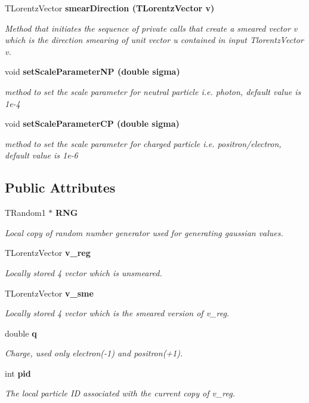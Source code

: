 \begin{CompactItemize}
TLorentz\-Vector \bf{smear\-Direction} (TLorentz\-Vector v)
\begin{CompactList}\small\item\em Method that initiates the sequence of private calls that create a smeared vector v which is the direction smearing of unit vector u contained in input Tlorentz\-Vector v. \item\end{CompactList}\item 
void \bf{set\-Scale\-Parameter\-NP} (double sigma)
\begin{CompactList}\small\item\em method to set the scale parameter for neutral particle i.e. photon, default value is 1e-4 \item\end{CompactList}\item 
void \bf{set\-Scale\-Parameter\-CP} (double sigma)
\begin{CompactList}\small\item\em method to set the scale parameter for charged particle i.e. positron/electron, default value is 1e-6 \item\end{CompactList}\end{CompactItemize}
\subsection*{Public Attributes}
\begin{CompactItemize}
\item 
TRandom1 $\ast$ \bf{RNG}
\begin{CompactList}\small\item\em Local copy of random number generator used for generating gaussian values. \item\end{CompactList}\item 
TLorentz\-Vector \bf{v\_\-reg}
\begin{CompactList}\small\item\em Locally stored 4 vector which is unsmeared. \item\end{CompactList}\item 
TLorentz\-Vector \bf{v\_\-sme}
\begin{CompactList}\small\item\em Locally stored 4 vector which is the smeared version of v\_\-reg. \item\end{CompactList}\item 
double \bf{q}
\begin{CompactList}\small\item\em Charge, used only electron(-1) and positron(+1). \item\end{CompactList}\item 
int \bf{pid}
\begin{CompactList}\small\item\em The local particle ID associated with the current copy of v\_\-reg. \item\end{CompactList}\end{CompactItemize}
